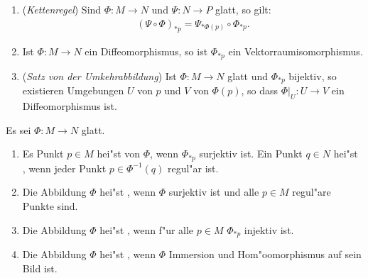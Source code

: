 \begin{emptythm}\hfill
  \begin{enumerate}[label=(\roman*),widest=iii]
  \item (\emph{Kettenregel}) Sind $\Phi \colon M \to N$ und $\Psi \colon N \to P$ glatt, so gilt:
    \begin{align*}
      (\Psi \circ \Phi)_{*p} = \Psi_{*\Phi(p)} \circ \Phi_{*p}.
    \end{align*}
  \item Ist $\Phi \colon M \to N$ ein Diffeomorphismus, so ist $\Phi_{*p}$ ein Vektorraumisomorphismus. %
  \item (\emph{Satz von der Umkehrabbildung}) Ist $\Phi \colon M \to N$ glatt und $\Phi_{*p}$ bijektiv, so existieren Umgebungen $U$ von $p$ und $V$ von $\Phi(p)$, so dass $\Phi|_{U} \colon U \to V$ ein Diffeomorphismus ist.
  \end{enumerate}
\end{emptythm}

\begin{Dfn}
  Es sei $\Phi \colon M \to N$ glatt.
  \begin{enumerate}[label=(\roman*),leftmargin=*,widest=iii]
  \item Es Punkt $p \in M$ hei"st  von $\Phi$, wenn $\Phi_{*p}$ surjektiv ist. Ein Punkt $q \in N$ hei"st , wenn jeder Punkt $p \in \Phi^{-1}(q)$ regul"ar ist.
  \item Die Abbildung $\Phi$ hei"st , wenn $\Phi$ surjektiv ist und alle $p \in M$ regul"are Punkte sind.
  \item Die Abbildung $\Phi$ hei"st , wenn f"ur alle $p \in M$ $\Phi_{*p}$ injektiv ist.
  \item Die Abbildung $\Phi$ hei"st , wenn $\Phi$ Immersion und Hom"oomorphismus auf sein Bild ist.
  \end{enumerate}
\end{Dfn}

